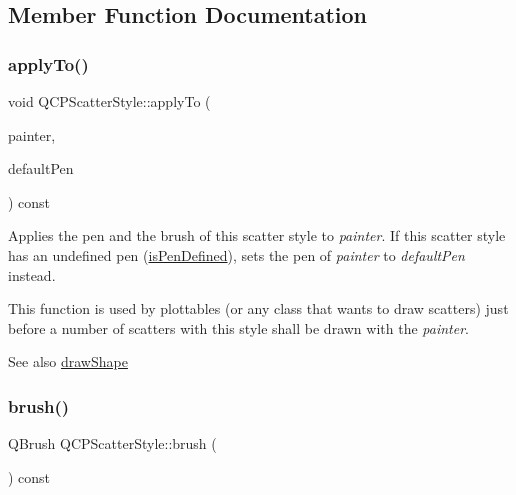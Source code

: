\subsection{Member Function Documentation}
\mbox{\label{class_q_c_p_scatter_style_afd8044ece445300499ca0dc164821e0f}} 
\subsubsection{\texorpdfstring{applyTo()}{applyTo()}}
{\footnotesize\ttfamily void Q\+C\+P\+Scatter\+Style\+::apply\+To (\begin{DoxyParamCaption}\item[{\mbox{\hyperlink{class_q_c_p_painter}{Q\+C\+P\+Painter}} $\ast$}]{painter,  }\item[{const Q\+Pen \&}]{default\+Pen }\end{DoxyParamCaption}) const}

Applies the pen and the brush of this scatter style to {\itshape painter}. If this scatter style has an undefined pen (\mbox{\hyperlink{class_q_c_p_scatter_style_a47077eb6450fe9a788f833e4ec1b1d5a}{is\+Pen\+Defined}}), sets the pen of {\itshape painter} to {\itshape default\+Pen} instead.

This function is used by plottables (or any class that wants to draw scatters) just before a number of scatters with this style shall be drawn with the {\itshape painter}.

\begin{DoxySeeAlso}{See also}
\mbox{\hyperlink{class_q_c_p_scatter_style_a89b5105e6027bfcbfeefed9d201b607c}{draw\+Shape}} 
\end{DoxySeeAlso}
\mbox{\label{class_q_c_p_scatter_style_adc4f66aed84f1d7a3a5aabf4f48f31a6}} 
\subsubsection{\texorpdfstring{brush()}{brush()}}
{\footnotesize\ttfamily Q\+Brush Q\+C\+P\+Scatter\+Style\+::brush (\begin{DoxyParamCaption}{ }\end{DoxyParamCaption}) const\hspace{0.3cm}{\ttfamily [inline]}}

